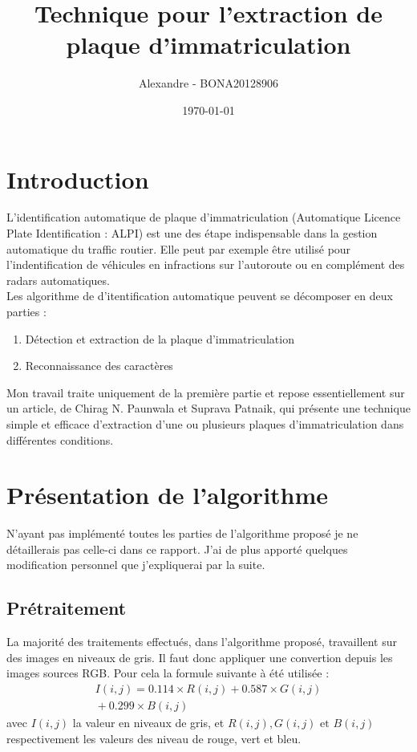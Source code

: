 \documentclass[a4paper,10pt,twocolumn]{article}
\title{\huge \textbf{Technique pour l'extraction de plaque d'immatriculation}}
\author{Alexandre \bsc{Bonhomme} - \small{BONA20128906}}
\date{\today}
\begin{document}
\maketitle

\section{Introduction}
L'identification automatique de plaque d'immatriculation (Automatique Licence Plate Identification : ALPI) est une des étape indispensable dans la gestion automatique du traffic routier. Elle peut par exemple être utilisé pour l'indentification de véhicules en infractions sur l'autoroute ou en complément des radars automatiques.\\
Les algorithme de d'itentification automatique peuvent se décomposer en deux parties : 
\begin{enumerate}
  \item Détection et extraction de la plaque d'immatriculation
  \item Reconnaissance des caractères
\end{enumerate}
Mon travail traite uniquement de la première partie et repose essentiellement sur un article, de Chirag N. Paunwala et Suprava Patnaik\cite{paunwala10}, qui présente une technique simple et efficace d'extraction d'une ou plusieurs plaques d'immatriculation dans différentes conditions.

\section{Présentation de l'algorithme}
N'ayant pas implémenté toutes les parties de l'algorithme proposé je ne détaillerais pas celle-ci dans ce rapport. J'ai de plus apporté quelques modification personnel que j'expliquerai par la suite.

\subsection{Prétraitement}
La majorité des traitements effectués, dans l'algorithme proposé, travaillent sur des images en niveaux de gris. Il faut donc appliquer une convertion depuis les images sources RGB. Pour cela la formule suivante à été utilisée :
\begin{gather}
  I(i, j) = 0.114\times R(i, j) + 0.587\times G(i, j) {} \\ {} + 0.299\times B(i, j)\nonumber
\end{gather}
avec $I(i,j)$ la valeur en niveaux de gris, et $R(i,j), G(i,j) \text{ et } B(i,j)$ respectivement les valeurs des niveau de rouge, vert et bleu.
\end{document}

